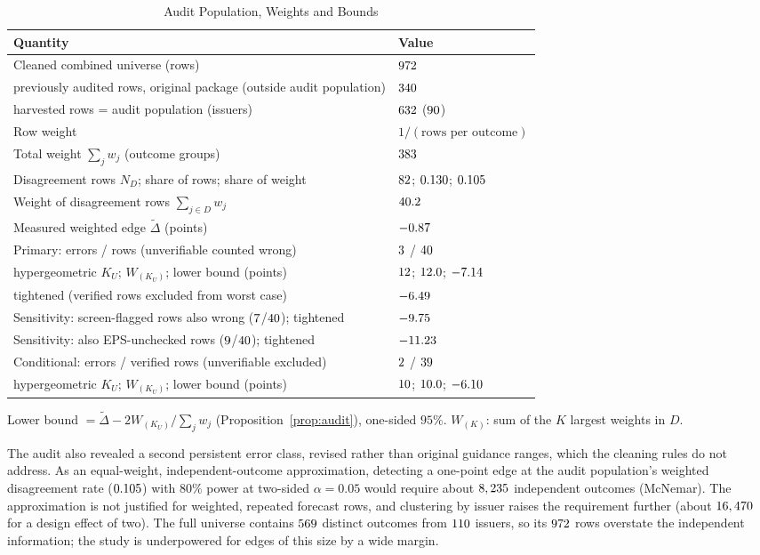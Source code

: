 \documentclass[journal]{IEEEtran}
\theoremstyle{definition}
\begin{document}
\begin{table}[!t]
\caption{Audit Population, Weights and Bounds}
\label{tab:audit}
\centering
\scriptsize
\setlength{\tabcolsep}{3pt}
\begin{tabular}{@{}p{}l@{}}
\toprule
Quantity & Value\\
\midrule
Cleaned combined universe (rows) & $972$\\
\quad previously audited rows, original package (outside audit population) & $340$\\
\quad harvested rows = audit population (issuers) & $632$ ($90$)\\
Row weight & $1/(\text{rows per outcome})$\\
Total weight $\sum_j w_j$ (outcome groups) & $383$\\
Disagreement rows $N_D$; share of rows; share of weight & $82$; $0.130$; $0.105$\\
Weight of disagreement rows $\sum_{j\in D}w_j$ & $40.2$\\
Measured weighted edge $\tilde\Delta$ (points) & $-0.87$\\
\midrule
Primary: errors / rows (unverifiable counted wrong) & $3$ / $40$\\
\quad hypergeometric $K_U$; $W_{(K_U)}$; lower bound (points) & $12$; $12.0$; $-7.14$\\
\quad tightened (verified rows excluded from worst case) & $-6.49$\\
\midrule
Sensitivity: screen-flagged rows also wrong ($7$/$40$); tightened & $-9.75$\\
Sensitivity: also EPS-unchecked rows ($9$/$40$); tightened & $-11.23$\\
Conditional: errors / verified rows (unverifiable excluded) & $2$ / $39$\\
\quad hypergeometric $K_U$; $W_{(K_U)}$; lower bound (points) & $10$; $10.0$; $-6.10$\\
\bottomrule
\end{tabular}
\vspace{2pt}

\parbox{\columnwidth}{\scriptsize Lower bound $=\tilde\Delta-2W_{(K_U)}/\sum_jw_j$ (Proposition~\ref{prop:audit}), one-sided $95\%$. $W_{(K)}$: sum of the $K$ largest weights in $D$.}
\end{table}

The audit also revealed a second persistent error class, revised rather than original guidance ranges, which the cleaning rules do not address. As an equal-weight, independent-outcome approximation, detecting a one-point edge at the audit population's weighted disagreement rate ($0.105$) with $80\%$ power at two-sided $\alpha=0.05$ would require about $8,235$ independent outcomes (McNemar). The approximation is not justified for weighted, repeated forecast rows, and clustering by issuer raises the requirement further (about $16,470$ for a design effect of two). The full universe contains $569$ distinct outcomes from $110$ issuers, so its $972$ rows overstate the independent information; the study is underpowered for edges of this size by a wide margin.
\end{document}
